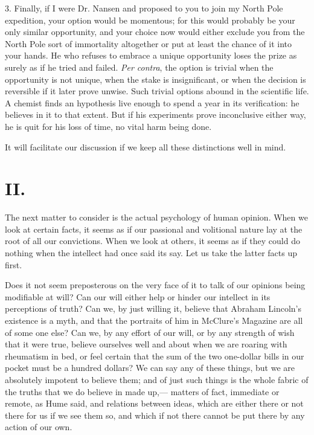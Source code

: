 \documentclass[12pt]{article}
\begin{document}

3.  Finally, if I were Dr. Nansen and proposed to you to join my North Pole expedition, your option would be momentous; for this would probably be your only similar opportunity, and your choice now would either exclude you from the North Pole sort of immortality altogether or put at least the chance of it into your hands.  He who refuses to embrace a unique opportunity loses the prize as surely as if he tried and failed.  \emph{Per contra}, the option is trivial when the opportunity is not unique, when the stake is insignificant, or when the decision is reversible if it later prove unwise.  Such trivial options abound in the scientific life.  A chemist finds an hypothesis live enough to spend a year in its verification: he believes in it to that extent. But if his experiments prove inconclusive either way, he is quit for his loss of time, no vital harm being done.

It will facilitate our discussion if we keep all these distinctions well in mind.

\section*{II.}

The next matter to consider is the actual psychology of human opinion. When we look at certain facts, it seems as if our passional and volitional nature lay at the root of all our convictions.  When we look at others, it seems as if they could do nothing when the intellect had once said its say.  Let us take the latter facts up first.

Does it not seem preposterous on the very face of it to talk of our opinions being modifiable at will?  Can our will either help or hinder our intellect in its perceptions of truth?  Can we, by just willing it, believe that Abraham Lincoln's existence is a myth,  and that the portraits of him in McClure's Magazine are all of some one else?  Can we, by any effort of our will, or by any strength of wish that it were true, believe ourselves well and about when we are roaring with rheumatism in bed, or feel certain that the sum of the two one-dollar bills in our pocket must be a hundred dollars?  We can say any of these things, but we are absolutely impotent to believe them; and of just such things is the whole fabric of the truths that we do believe in made up,--- matters of fact, immediate or remote, as Hume said, and relations between ideas, which are either there or not there for us if we see them so, and which if not there cannot be put there by any action of our own.
\end{document}
